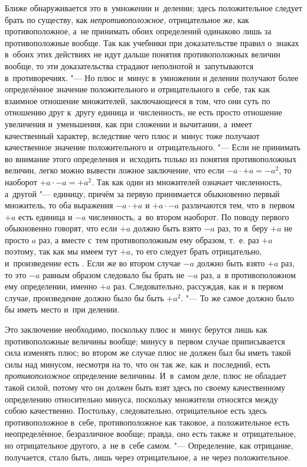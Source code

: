 Ближе обнаруживается это в~умножении и~делении; здесь положительное следует
брать по существу, как {\em непротивоположное,}
отрицательное же, как противоположное, а~не принимать обоих определений
одинаково лишь за противоположные вообще. Так как учебники при
доказательстве правил о~знаках в~обоих этих действиях не идут дальше
понятия противоположных величин вообще, то эти доказательства страдают
неполнотой и~запутываются в~противоречиях. "--- Но плюс и~минус в~умножении и
делении получают более определённое значение положительного и
отрицательного в~себе, так как взаимное отношение множителей, заключающееся
в том, что они суть по отношению друг к~другу единица и~численность, не
есть просто отношение увеличения и~уменьшения, как при сложении и
вычитании, а~имеет качественный характер, вследствие чего плюс и~минус тоже
получают качественное значение положительного и~отрицательного. "--- Если не
принимать во внимание этого определения и~исходить только из понятия
противоположных величин, легко можно вывести ложное заключение, что если
$-a\cdot+a=-a^2$, то наоборот $+a\cdot-a=+a^2$. Так как один из множителей
означает численность, а~другой "--- единицу, причём за первую принимается
обыкновенно первый множитель,
то оба выражения $-a\cdot+a$ и $+a\cdot-a$ различаются тем,
что в~первом $+a$ есть единица и $-a$ численность, а~во втором наоборот.
По поводу первого обыкновенно говорят, что если $+a$ должно
быть взято $-a$ раз, то я~беру $+a$ не просто $a$ раз, а
вместе с~тем противоположным ему образом, т.~е. раз $+a$
поэтому, так как мы имеем тут {\em $+a$,} то его следует
брать отрицательно, и~произведение есть . Если же во втором случае
$-a$ должно быть взято $+a$ раз, то это $-a$
равным образом следовало бы брать не $-a$ раз, а~в
противоположном ему определении, именно $+a$ раз.
Следовательно, рассуждая, как и~в первом случае, произведение должно было
бы быть $+a^2$. "--- То же самое должно было бы иметь место и~при делении.

Это заключение необходимо, поскольку плюс и~минус берутся лишь как
противоположные величины вообще; минусу в~первом случае приписывается сила
изменять плюс; во втором же случае плюс не должен был бы иметь такой силы
над минусом, несмотря на то, что он так же, как и~последний, есть
{\em противоположное} определение величины. И~в~самом
деле, плюс не обладает такой силой, потому что он должен быть взят здесь по
своему качественному определению относительно минуса, поскольку множители
относятся между собою качественно. Постольку, следовательно, отрицательное
есть здесь противоположное в~себе, противоположное как таковое, а
положительное есть неопределённое, безразличное вообще; правда, оно есть
также и~отрицательное, но отрицательное другого, а~не в~себе самом. "---
Определение, как отрицание, получается, стало быть, лишь через
отрицательное, а~не через положительное.

